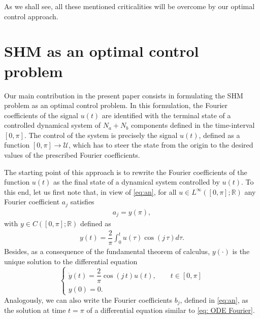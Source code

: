 \documentclass[twocolumn]{autart}    %
\begin{document}
%
% 
As we shall see, all these mentioned criticalities will be overcome by our optimal control approach.

\section{SHM as an optimal control problem}\label{sec:Contributions}

Our main contribution in the present paper consists in formulating the SHM problem as an optimal control problem. In this formulation, the Fourier coefficients of the signal $u(t)$ are identified with the terminal state of a controlled dynamical system of $N_a+N_b$ components defined in the time-interval $[0,\pi]$.  The control of the system is precisely the signal $u(t)$, defined as a function $[0,\pi]\to \mathcal{U}$, which has to steer the state from the origin to the desired values of the prescribed Fourier coefficients. 

The starting point of this approach is to rewrite the Fourier coefficients of the function $u(t)$ as the final state of a dynamical system controlled by $u(t)$. To this end, let us first note that, in view of \eqref{eq:an}, for all $u\in L^\infty ([0,\pi];\mathbb{R})$ any Fourier coefficient $a_j$ satisfies
\begin{align*}
	a_j = y(\pi), 
\end{align*}
with $y\in C([0,\pi];\mathbb{R})$ defined as
\begin{align*}
	y(t) = \dfrac{2}{\pi} \int_0^t u(\tau) \cos(j\, \tau) d\tau.
\end{align*}
Besides, as a consequence of the fundamental theorem of calculus, $y(\cdot)$ is the unique solution to the differential equation
\begin{equation}\label{eq: ODE Fourier}
	\begin{cases}
		\dot{y} (t) = \dfrac{2}{\pi} \cos(j\, t) u(t), \qquad  t\in [0,\pi]
		\\[5pt]
		y(0) = 0.
	\end{cases}
\end{equation}
Analogously, we can also write the Fourier coefficients $b_j$, defined in \eqref{eq:an}, as the solution at time $t=\pi$ of a differential equation similar to \eqref{eq: ODE Fourier}.
\end{document}
